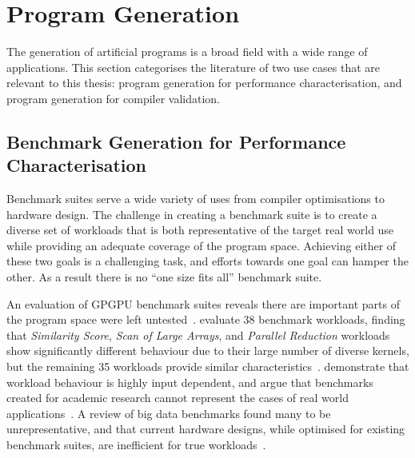 \section{Program Generation}
\label{sec:related-work-generation}

The generation of artificial programs is a broad field with a wide range of applications. This section categorises the literature of two use cases that are relevant to this thesis: program generation for performance characterisation, and program generation for compiler validation.

\subsection{Benchmark Generation for Performance Characterisation}

Benchmark suites serve a wide variety of uses from compiler optimisations to hardware design. The challenge in creating a benchmark suite is to create a diverse set of workloads that is both representative of the target real world use while providing an adequate coverage of the program space. Achieving either of these two goals is a challenging task, and efforts towards one goal can hamper the other. As a result there is no ``one size fits all'' benchmark suite.

An evaluation of GPGPU benchmark suites reveals there are important parts of the program space were left untested~\cite{Ryoo2015}.
\citeauthor{Goswami2010} evaluate 38 benchmark workloads, finding that \emph{Similarity Score}, \emph{Scan of Large Arrays}, and \emph{Parallel Reduction} workloads show significantly different behaviour due to their large number of diverse kernels, but the remaining 35 workloads provide similar characteristics~\cite{Goswami2010}.
\citeauthor{Xiong2013} demonstrate that workload behaviour is highly input dependent, and argue that benchmarks created for academic research cannot represent the cases of real world applications~\cite{Xiong2013}.
A review of big data benchmarks found many to be unrepresentative, and that current hardware designs, while optimised for existing benchmark suites, are inefficient for true workloads~\cite{Ferdman2012}.

